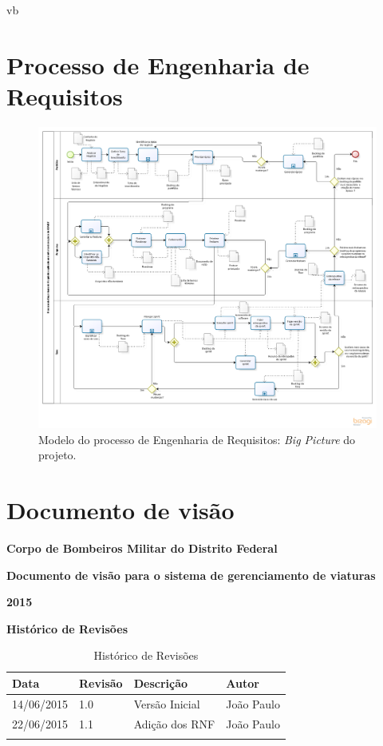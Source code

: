 vb\begin{apendicesenv}
  
  \chapter{Processo de Engenharia de Requisitos}
  
    \begin{figure}[!htbp]
      \centering
      \includegraphics[scale=0.46, angle = 90]{editaveis/figuras/project_big_picture}
      \caption[Modelo do processo de Engenharia de Requisitos]
	  {Modelo do processo de Engenharia de Requisitos: \textit{Big Picture} do projeto.}
      \label{project_big_picture}
    \end{figure}
  
  \chapter{Documento de visão}
	{\centering
	\textbf{Corpo de Bombeiros Militar do Distrito Federal}

	\textbf{Documento de visão para o sistema de gerenciamento de viaturas}

	\textbf{2015}

	}
	\textbf{Histórico de Revisões}
	\begin{table}[h]
	\centering
	\label{my-label}
	\begin{tabular}{|l|l|l|l|}
	\hline
	Data & Revisão & Descrição & Autor \\ \hline
	14/06/2015 & 1.0 & Versão Inicial & João Paulo \\ \hline
	22/06/2015 & 1.1 & Adição dos RNF & João Paulo \\ \hline
	     &         &           &       \\ \hline
	\end{tabular}
	\caption{Histórico de Revisões}
	\end{table}
  

\end{apendicesenv}
